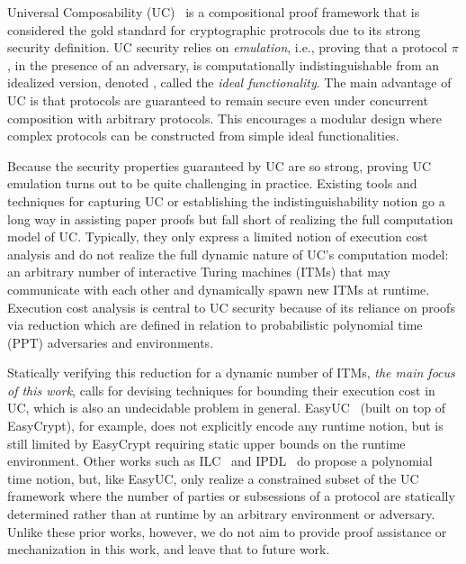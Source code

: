 
Universal Composability (UC)~\cite{canettiUC} is a compositional proof
framework that is considered the gold standard for cryptographic protrocols due
to its strong security definition.  UC security relies on \emph{emulation},
i.e., proving that a protocol $\pi$, in the presence of an adversary, is
computationally indistinguishable from an idealized version, denoted \F, called the
\emph{ideal functionality}.  The main advantage of UC is that protocols are
guaranteed to remain secure even under concurrent composition with arbitrary
protocols.  This encourages a modular design where complex protocols can be
constructed from simple ideal functionalities.

Because the security properties guaranteed by UC are so strong, proving UC
emulation turns out to be quite challenging in practice. Existing tools and
techniques for capturing UC or establishing the indistinguishability notion go
a long way in assisting paper proofs but fall short of realizing the full
computation model of UC.  Typically, they only express a limited notion of
execution cost analysis and do not realize the full dynamic nature of UC's
computation model: an arbitrary number of interactive Turing machines (ITMs)
that may communicate with each other and dynamically spawn new ITMs at runtime.
Execution cost analysis is central to UC security because of its reliance on
proofs via reduction which are defined in relation to probabilistic polynomial
time (PPT) adversaries and environments.

Statically verifying this reduction for a dynamic number of ITMs, \emph{the
main focus of this work}, calls for devising techniques for bounding their
execution cost in UC, which is also an undecidable problem in general.
EasyUC~\cite{easyuc} (built on top of EasyCrypt), for example, does not
explicitly encode any runtime notion, but is still limited by EasyCrypt
requiring static upper bounds on the runtime environment.  Other works such as
ILC~\cite{ilc} and IPDL~\cite{ipdl} do propose a polynomial time notion, but,
like EasyUC, only realize a constrained subset of the UC framework where the
number of parties or subsessions of a protocol are statically determined rather
than at runtime by an arbitrary environment or adversary.  Unlike these prior
works, however, we do not aim to provide proof assistance or mechanization in
this work, and leave that to future work.

